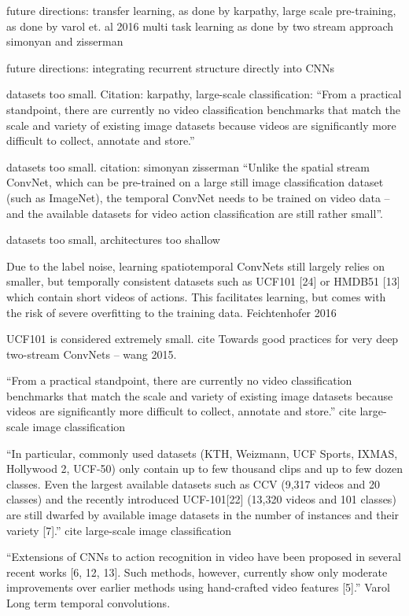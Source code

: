 future directions: transfer learning, as done by karpathy, large scale
pre-training, as done by varol et. al 2016
multi task learning as done by two stream approach simonyan and zisserman

future directions: integrating recurrent structure directly into CNNs 

datasets too small. Citation: karpathy, large-scale classification: ``From a practical standpoint, there are currently no video classification benchmarks that match the scale and variety of existing image datasets because videos are significantly more difficult to collect, annotate and store.''

datasets too small. citation: simonyan zisserman ``Unlike the spatial stream ConvNet, which can be pre-trained on a large still image classification dataset (such as ImageNet), the temporal ConvNet needs to be trained on video data – and the available datasets for video action classification are still rather small''.

datasets too small, architectures too shallow \cite{wang_towards_2015}

Due to the label noise, learning spatiotemporal ConvNets still largely relies on smaller, but temporally consistent datasets such as UCF101 [24] or HMDB51 [13] which contain short videos of actions.
This facilitates learning, but comes with the risk of severe overfitting to the training data. Feichtenhofer 2016

UCF101 is considered extremely small. cite Towards good practices for very deep two-stream ConvNets -- wang 2015.

``From a practical standpoint, there are currently no video classification benchmarks that match the scale and variety of existing image datasets because videos are significantly more difficult to collect, annotate and store.'' cite large-scale image classification

``In particular, commonly used datasets (KTH, Weizmann, UCF Sports, IXMAS, Hollywood 2, UCF-50) only contain up to few thousand clips and up to few dozen classes.
Even the largest available datasets such as CCV (9,317 videos and 20 classes) and the recently introduced UCF-101[22] (13,320 videos and 101 classes) are still dwarfed by available image datasets in the number of instances and their variety [7].'' cite large-scale image classification

``Extensions of CNNs to action recognition in video have been proposed in several recent works [6, 12, 13]. Such methods, however, currently show only moderate improvements over earlier methods using hand-crafted video features [5].''
Varol Long term temporal convolutions.


